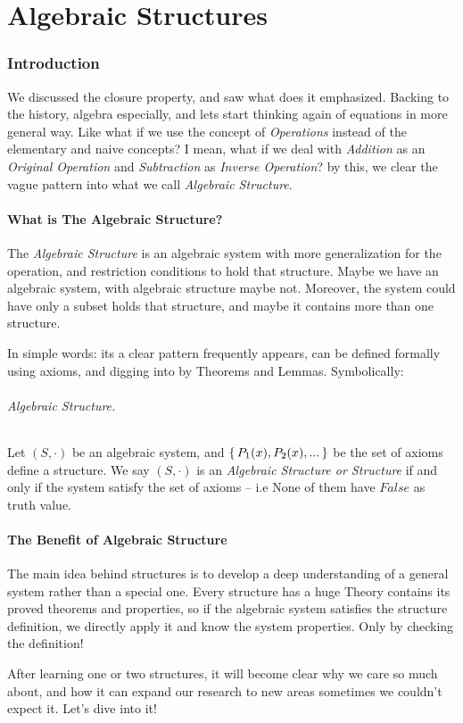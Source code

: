 \part{Algebraic Structures}
\section{Introduction}
We discussed the closure property, and saw what does it emphasized. Backing to the history, algebra especially, and lets start thinking again of equations in more general way. Like what if we use the concept of {\it Operations} instead of the elementary and naive concepts? I mean, what if we deal with {\it Addition} as an {\it Original Operation} and {\it Subtraction} as {\it Inverse Operation}? by this, we clear the vague pattern into what we call {\it Algebraic Structure}.

\subsection{What is The Algebraic Structure?}
The {\it Algebraic Structure} is an algebraic system with more generalization for the operation, and restriction conditions to hold that structure. Maybe we have an algebraic system, with algebraic structure maybe not. Moreover, the system could have only a subset holds that structure, and maybe it contains more than one structure.

In simple words: its a clear pattern frequently appears, can be defined formally using axioms, and digging into by Theorems and Lemmas. Symbolically:

\paragraph{Algebraic Structure.} Let $(S,\cdot)$ be an algebraic system, and $\set{P_1(x),P_2(x),...}$
be the set of axioms define a structure. We say $(S,\cdot)$ is an {\it Algebraic Structure or Structure} if and only if the system satisfy the set of axioms -- i.e None of them have $False$ as truth value. 

\subsection{The Benefit of Algebraic Structure}
The main idea behind structures is to develop a deep understanding of a general system rather than a special one. Every structure has a huge Theory contains its proved theorems and properties, so if the algebraic system satisfies the structure definition, we directly apply it and know the system properties. Only by checking the definition!

After learning one or two structures, it will become clear why we care so much about, and how it can expand our research to new areas sometimes we couldn't expect it. Let's dive into it!